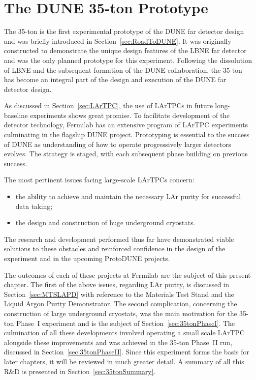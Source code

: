 
\graphicspath{{35ton/Figs/}}

\chapter{The DUNE 35-ton Prototype}\label{chap:35ton}

The 35-ton is the first experimental prototype of the DUNE far detector design and was briefly introduced in Section~\ref{sec:RoadToDUNE}.  It was originally constructed to demonstrate the unique design features of the LBNE far detector and was the only planned prototype for this experiment.  Following the dissolution of LBNE and the subsequent formation of the DUNE collaboration, the 35-ton has become an integral part of the design and execution of the DUNE far detector design.

As discussed in Section~\ref{sec:LArTPC}, the use of LArTPCs in future long-baseline experiments shows great promise.  To facilitate development of the detector technology, Fermilab has an extensive program of LArTPC experiments culminating in the flagship DUNE project.  Prototyping is essential to the success of DUNE as understanding of how to operate progressively larger detectors evolves.  The strategy is staged, with each subsequent phase building on previous success.

The most pertinent issues facing large-scale LArTPCs concern:
\begin{itemize}
  \item the ability to achieve and maintain the necessary LAr purity for successful data taking;
  \item the design and construction of huge underground cryostats.
\end{itemize}
The research and development performed thus far have demonstrated viable solutions to these obstacles and reinforced confidence in the design of the experiment and in the upcoming ProtoDUNE projects.

The outcomes of each of these projects at Fermilab are the subject of this present chapter.  The first of the above issues, regarding LAr purity, is discussed in Section~\ref{sec:MTSLAPD} with reference to the Materials Test Stand and the Liquid Argon Purity Demonstrator.  The second complication, concerning the construction of large underground cryostats, was the main motivation for the 35-ton Phase~I experiment and is the subject of Section~\ref{sec:35tonPhaseI}.  The culmination of all these developments involved operating a small scale LArTPC alongside these improvements and was achieved in the 35-ton Phase~II run, discussed in Section~\ref{sec:35tonPhaseII}.  Since this experiment forms the basis for later chapters, it will be reviewed in much greater detail.  A summary of all this R\&D is presented in Section~\ref{sec:35tonSummary}.


